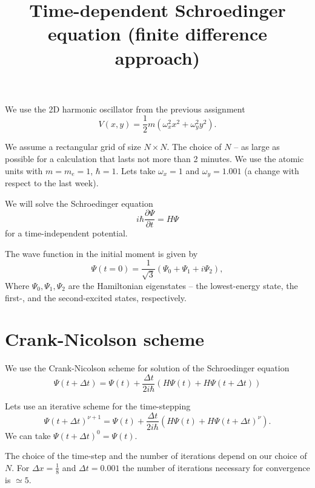 \documentclass[10pt,a4paper]{article}
\title{Time-dependent Schroedinger equation (finite difference approach)}
\date{}
\begin{document}
\maketitle
\small

We use the 2D  harmonic oscillator from the previous assignment 
\begin{equation}
V(x,y)=\frac{1}{2}m\left(\omega_x^2 x^2 + \omega_y^2 y^2\right).
\end{equation}

We assume a rectangular grid of size $N \times N$. The choice of $N$ -- as large as possible for a calculation that lasts not more than 2 minutes.
We use the atomic units with $m=m_e=1$,  $\hbar=1$. Lets take $\omega_x=1$ and $\omega_y=1.001$ (a change with respect to the last week).

We will solve the Schroedinger equation \begin{equation} i\hbar \frac{\partial \Psi}{\partial t}=H \Psi\end{equation}
for a time-independent potential. 

The wave function in the initial moment is given by \begin{equation}\Psi(t=0)=\frac{1}{\sqrt{3}}\left(\Psi_0+\Psi_1+i\Psi_2\right),\end{equation}
Where $\Psi_0, \Psi_1,\Psi_2$ are the Hamiltonian eigenstates -- the lowest-energy state, the first-, and the second-excited states, respectively.  



\section*{Crank-Nicolson scheme}
We use the Crank-Nicolson scheme for solution of the Schroedinger equation
\begin{equation}
\Psi(t+\Delta t)=\Psi(t)+\frac{\Delta t}{2 i\hbar}\left(H\Psi(t)+H\Psi(t+\Delta t)\right)
\end{equation}

Lets use an iterative scheme for the time-stepping
\begin{equation}
\Psi(t+\Delta t)^{\nu+1}=\Psi(t)+\frac{\Delta t}{2 i\hbar}\left(H\Psi(t)+H\Psi(t+\Delta t)^\nu\right).
\end{equation}
We can take $\Psi(t+\Delta t)^0=\Psi(t)$.

The choice of the time-step and the number of iterations depend on our choice of $N$.
For $\Delta x=\frac{1}{8}$ and $\Delta t=0.001$ the number of iterations 
necessary for convergence is $\simeq 5$.
\end{document}
